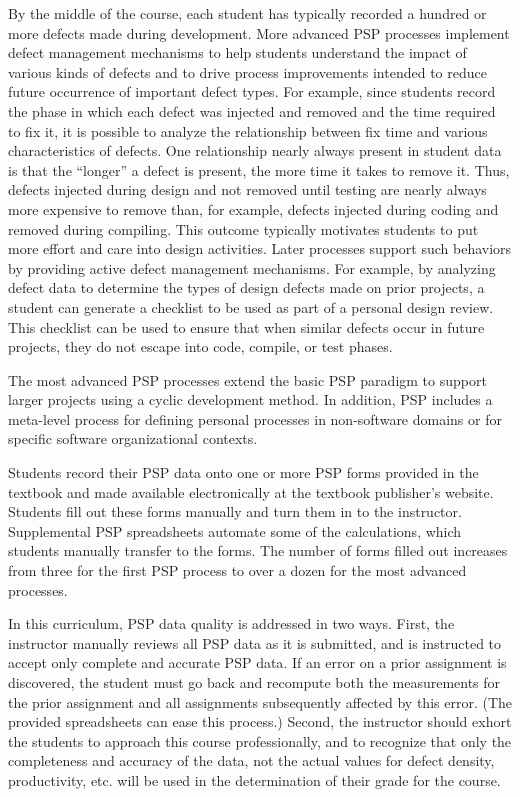 By the middle of the course, each student has typically recorded a hundred
or more defects made during development.  More advanced PSP processes
implement defect management mechanisms to help students understand the
impact of various kinds of defects and to drive process improvements
intended to reduce future occurrence of important defect types. For
example, since students record the phase in which each defect was injected and
removed and the time required to fix it, it is possible to analyze the
relationship between fix time and various characteristics of defects.  One
relationship nearly always present in student data is that the ``longer'' a
defect is present, the more time it takes to remove it.  Thus, defects
injected during design and not removed until testing are nearly always more
expensive to remove than, for example, defects injected during coding and
removed during compiling. This outcome typically motivates students to put
more effort and care into design activities. Later processes support such
behaviors by providing active defect management mechanisms. For example, by
analyzing defect data to determine the types of design defects made on
prior projects, a student can generate a checklist to be used as part of a
personal design review. This checklist can be used to ensure that when
similar defects occur in future projects, they do not escape into code,
compile, or test phases.

The most advanced PSP processes extend the basic PSP paradigm to support
larger projects using a cyclic development method. In addition, PSP
includes a meta-level process for defining personal processes in
non-software domains or for specific software organizational contexts.

Students record their PSP data onto one or more PSP forms provided in the
textbook and made available electronically at the textbook publisher's
website. Students fill out these forms manually and turn them in to the
instructor.  Supplemental PSP spreadsheets automate some of the
calculations, which students manually transfer to the forms. The number of
forms filled out increases from three for the first PSP process to over a
dozen for the most advanced processes.

In this curriculum, PSP data quality is addressed in two ways. First, the
instructor manually reviews all PSP data as it is submitted, and is
instructed to accept only complete and accurate PSP data.  If an error on a
prior assignment is discovered, the student must go back and recompute both
the measurements for the prior assignment and all assignments subsequently
affected by this error. (The provided spreadsheets can ease this process.)
Second, the instructor should exhort the students to approach this course
professionally, and to recognize that only the completeness and accuracy of
the data, not the actual values for defect density, productivity, etc. will
be used in the determination of their grade for the course.

